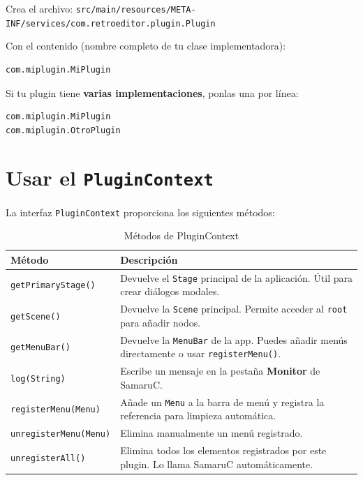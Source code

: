 \documentclass[../../main.tex]{subfiles}
\begin{document}
Crea el archivo:
\texttt{src/main/resources/META-INF/services/com.retroeditor.plugin.Plugin}

Con el contenido (nombre completo de tu clase implementadora):

\begin{lstlisting}
com.miplugin.MiPlugin
\end{lstlisting}

Si tu plugin tiene \textbf{varias implementaciones}, ponlas una por línea:

\begin{lstlisting}
com.miplugin.MiPlugin
com.miplugin.OtroPlugin
\end{lstlisting}

\clearpage

\section{Usar el \texttt{PluginContext}}

La interfaz \texttt{PluginContext} proporciona los siguientes métodos:

\begin{table}[ht]
    \centering
    \small
    \begin{tabular}{p{4cm}p{8cm}}
    \toprule
    \textbf{Método} & \textbf{Descripción} \\
    \midrule
    \texttt{getPrimaryStage()} & Devuelve el \texttt{Stage} principal de la aplicación. Útil para crear diálogos modales. \\
    \texttt{getScene()} & Devuelve la \texttt{Scene} principal. Permite acceder al \texttt{root} para añadir nodos. \\
    \texttt{getMenuBar()} & Devuelve la \texttt{MenuBar} de la app. Puedes añadir menús directamente o usar \texttt{registerMenu()}. \\
    \texttt{log(String)} & Escribe un mensaje en la pestaña \textbf{Monitor} de SamaruC. \\
    \texttt{registerMenu(Menu)} & Añade un \texttt{Menu} a la barra de menú y registra la referencia para limpieza automática. \\
    \texttt{unregisterMenu(Menu)} & Elimina manualmente un menú registrado. \\
    \texttt{unregisterAll()} & Elimina todos los elementos registrados por este plugin. Lo llama SamaruC automáticamente. \\
    \bottomrule
    \end{tabular}
    \caption{Métodos de PluginContext}
    \label{tab:metodos_plugin_context}
\end{table}
\end{document}

